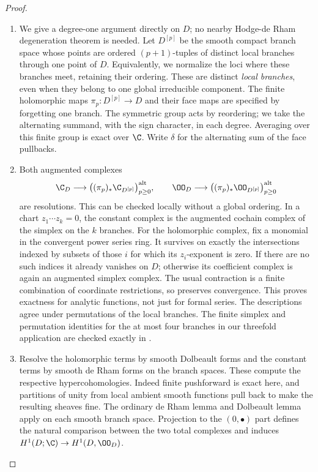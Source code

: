 \begin{proof}
\begin{enumerate}[label=\arabic*.,leftmargin=*]
\item We give a degree-one argument directly on $D$; no nearby
Hodge-de Rham degeneration theorem is needed. Let
$D^{[p]}$ be the smooth compact branch space whose points are
ordered $(p+1)$-tuples of distinct local branches through one
point of $D$. Equivalently, we normalize the loci where these
branches meet, retaining their ordering. These are distinct
\emph{local branches}, even when they belong to one global
irreducible component. The finite holomorphic maps
$\pi_p:D^{[p]}\to D$ and their face maps are specified by
forgetting one branch. The symmetric group acts by reordering;
we take the alternating summand, with the sign character, in
each degree. Averaging over this finite group is exact over
$\C$. Write $\delta$ for the alternating sum of the face
pullbacks.

\item Both augmented complexes
\[
 \C_D\longrightarrow
 \bigl((\pi_p)_*\C_{D^{[p]}}\bigr)_{p\geq0}^{\mathrm{alt}},
 \qquad
 \OO_D\longrightarrow
 \bigl((\pi_p)_*\OO_{D^{[p]}}\bigr)_{p\geq0}^{\mathrm{alt}}
\]
are resolutions. This can be checked locally without a global
ordering. In a chart $z_1\cdots z_k=0$, the constant complex is
the augmented cochain complex of the simplex on the $k$ branches.
For the holomorphic complex, fix a monomial in the convergent
power series ring. It survives on exactly the intersections
indexed by subsets of those $i$ for which its $z_i$-exponent is
zero. If there are no such indices it already vanishes on $D$;
otherwise its coefficient complex is again an augmented simplex
complex. The usual contraction is a finite combination of
coordinate restrictions, so preserves convergence. This proves
exactness for analytic functions, not just for formal series.
The descriptions agree under permutations of the local branches.
The finite simplex and permutation identities for the at most
four branches in our threefold application are checked exactly
in .

\item Resolve the holomorphic terms by smooth Dolbeault forms and
the constant terms by smooth de Rham forms on the branch spaces.
These compute the respective hypercohomologies. Indeed finite
pushforward is exact here, and partitions of unity from local
ambient smooth functions pull back to make the resulting sheaves
fine. The ordinary de Rham lemma and Dolbeault lemma apply on
each smooth branch space. Projection to the $(0,\bullet)$
part defines the natural comparison between the two total
complexes and induces $H^1(D;\C)\to H^1(D,\OO_D)$.


\end{enumerate}
\end{proof}
